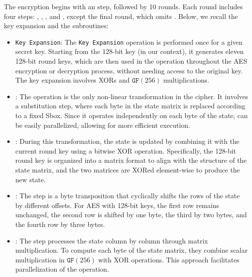 The encryption begins with an \AddRoundKey step, followed by 10 rounds. Each round includes four steps: \SubBytes, \ShiftRows, \MixColumns, and \AddRoundKey, except the final round, which omits \MixColumns. Below, we recall the key expansion and the subroutines:
\begin{itemize}
\item \texttt{Key Expansion}: The \texttt{Key Expansion} operation is performed once for a given secret key. Starting from the 128-bit key (in our context), it generates eleven 128-bit round keys, which are then used in the \AddRoundKey operation throughout the AES encryption or decryption process, without needing access to the original key. The key expansion involves XORs and $\mathtt{GF}(256)$ multiplications.

    \item \SubBytes: The \SubBytes operation is the only non-linear transformation in the cipher. It involves a substitution step, where each byte in the state matrix is replaced according to a fixed Sbox. Since it operates independently on each byte of the state, \SubBytes can be easily parallelized, allowing for more efficient execution.
    \item \AddRoundKey: 
    During this transformation, the state is updated by combining it with the current round key using a bitwise XOR operation. Specifically, the 128-bit round key is organized into a matrix format to align with the structure of the state matrix, and the two matrices are XORed element-wise to produce the new state.
   
    \item \ShiftRows: The \ShiftRows step is a byte transposition that cyclically shifts the rows of the state by different offsets. For AES with 128-bit keys, the first row remains unchanged, the second row is shifted by one byte, the third by two bytes, and the fourth row by three bytes. 

    \item \MixColumns: The \MixColumns step processes the state column by column through matrix multiplication. To compute each byte of the state matrix, they combine scalar multiplication in $\mathtt{GF}(256)$ with XOR operations. This approach facilitates parallelization of the operation.  
    
    
\end{itemize}

